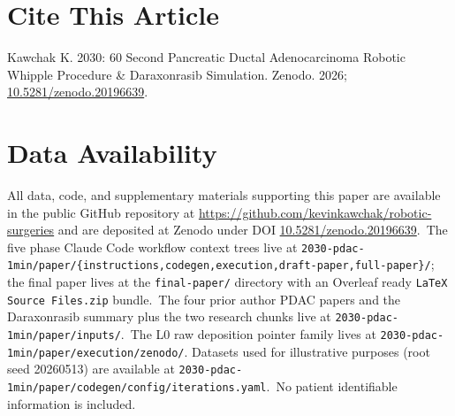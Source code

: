 \vspace{-0.1cm}

{}
\section*{Cite This Article}
\label{sec:cite}
\vspace{-0.15cm}
Kawchak K. 2030: 60 Second Pancreatic Ductal Adenocarcinoma Robotic Whipple Procedure \& Daraxonrasib Simulation. Zenodo. 2026;
\href{https://doi.org/10.5281/zenodo.20196639}{10.5281/zenodo.20196639}.

\vspace{-0.1cm}

{}
\section*{Data Availability}
\label{sec:data}
\vspace{-0.15cm}
All data, code, and supplementary materials supporting this paper
are available in the public GitHub repository at
\url{https://github.com/kevinkawchak/robotic-surgeries} and are
deposited at Zenodo under DOI
\href{https://doi.org/10.5281/zenodo.20196639}{10.5281/zenodo.20196639}.\
The five phase Claude Code workflow context trees live at
\texttt{2030-pdac-1min/paper/\{instructions,codegen,execution,draft-paper,full-paper\}/}; the final paper lives at the
\texttt{final-paper/} directory with an Overleaf ready
\texttt{LaTeX Source Files.zip} bundle.\ The four prior author PDAC
papers and the Daraxonrasib summary plus the two research chunks
live at \texttt{2030-pdac-1min/paper/inputs/}.\ The L0 raw
deposition pointer family lives at
\texttt{2030-pdac-1min/paper/execution/zenodo/}. Datasets
used for illustrative purposes (root seed 20260513) are available at
\texttt{2030-pdac-1min/paper/codegen/config/iterations.yaml}.\ No
patient identifiable information is included.

\clearpage
